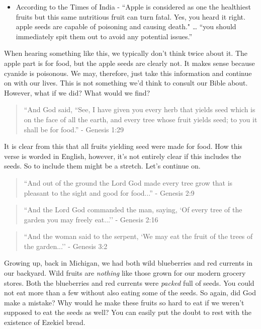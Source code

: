 \documentclass[9.5pt]{article}
\begin{document}
\begin{multicols}{2}
\begin{itemize}
\item According to the Times of India - ``Apple is considered as one the healthiest fruits but this same nutritious fruit can turn fatal. Yes, you heard it right. apple seeds are capable of poisoning and causing death." … ``you should immediately spit them out to avoid any potential issues.” \cite{India Times Apple Seeds}
\end{itemize}

When hearing something like this, we typically don't think twice about it. The apple part is for food, but the apple seeds are clearly not. It makes sense because cyanide is poisonous. We may, therefore, just take this information and continue on with our lives. This is not something we'd think to consult our Bible about. However, what if we did? What would we find? 

\begin{quotation}
``And God said, “See, I have given you every herb that yields seed which is on the face of all the earth, and every tree whose fruit yields seed; to you it shall be for food.'' - Genesis 1:29
\end{quotation}

It is clear from this that all fruits yielding seed were made for food. How this verse is worded in English, however, it's not entirely clear if this includes the seeds. So to include them might be a stretch. Let's continue on.

\begin{quotation}
``And out of the ground the Lord God made every tree grow that is pleasant to the sight and good for food...'' - Genesis 2:9
\end{quotation}

\begin{quotation}
``And the Lord God commanded the man, saying, `Of every tree of the garden you may freely eat...'' - Genesis 2:16
\end{quotation}

\begin{quotation}
``And the woman said to the serpent, `We may eat the fruit of the trees of the garden...'' - Genesis 3:2
\end{quotation}

Growing up, back in Michigan, we had both wild blueberries and red currents in our backyard. Wild fruits are \textit{nothing} like those grown for our modern grocery stores. Both the blueberries and red currents were \textit{packed} full of seeds. You could not eat more than a few without also eating some of the seeds. So again, did God make a mistake? Why would he make these fruits so hard to eat if we weren't supposed to eat the seeds as well? You can easily put the doubt to rest with the existence of Ezekiel bread.


\end{multicols}
\end{document}
